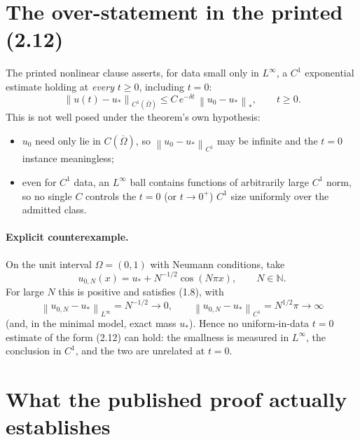 \documentclass[11pt]{article}
\newcommand{\N}{\mathbb{N}}
\newcommand{\Om}{\Omega}
\newcommand{\norm}[1]{\left\lVert #1\right\rVert}
\begin{document}
\section{The over-statement in the printed (2.12)}

The printed nonlinear clause asserts, for data small only in $L^{\infty}$, a
$C^{1}$ exponential estimate holding at \emph{every} $t\ge 0$, including $t=0$:
\[
  \norm{u(t)-u_{*}}_{C^{1}(\overline{\Om})}
    \le C\,e^{-\delta t}\,\norm{u_{0}-u_{*}}_{\ast},
  \qquad t\ge 0 .
\]
This is not well posed under the theorem's own hypothesis:
\begin{itemize}[nosep]
\item $u_{0}$ need only lie in $C(\overline{\Om})$, so $\norm{u_{0}-u_{*}}_{C^{1}}$
  may be infinite and the $t=0$ instance meaningless;
\item even for $C^{1}$ data, an $L^{\infty}$ ball contains functions of
  arbitrarily large $C^{1}$ norm, so no single $C$ controls the $t=0$
  (or $t\to 0^{+}$) $C^{1}$ size uniformly over the admitted class.
\end{itemize}

\paragraph{Explicit counterexample.}
On the unit interval $\Om=(0,1)$ with Neumann conditions, take
\[
  u_{0,N}(x) = u_{*} + N^{-1/2}\cos(N\pi x), \qquad N\in\N .
\]
For large $N$ this is positive and satisfies (1.8), with
\[
  \norm{u_{0,N}-u_{*}}_{L^{\infty}} = N^{-1/2}\to 0,
  \qquad
  \norm{u_{0,N}-u_{*}}_{C^{1}} = N^{1/2}\pi\to\infty
\]
(and, in the minimal model, exact mass $u_{*}$).  Hence no uniform-in-data
$t=0$ estimate of the form (2.12) can hold: the smallness is measured in
$L^{\infty}$, the conclusion in $C^{1}$, and the two are unrelated at $t=0$.

\section{What the published proof actually establishes}
\end{document}
